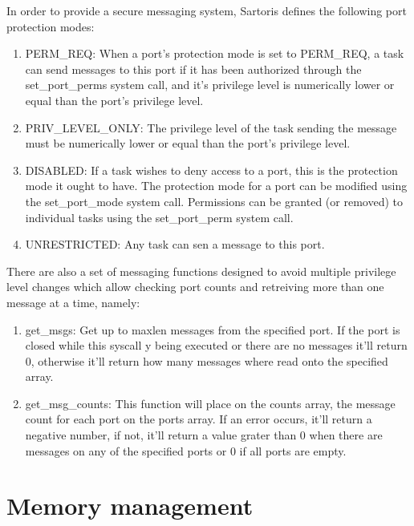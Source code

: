 \documentclass[11pt, letterpaper, twoside, english]{book}
\begin{document}
In order to provide a secure messaging system, Sartoris defines the following port protection modes:
\begin{enumerate}
\item[]\textsf{PERM\_REQ}: When a port's protection mode is set to \textsf{PERM\_REQ}, a task can send messages to this port if it has been authorized through the \textsf{set\_port\_perms} system call, and it's privilege level is numerically lower or equal than the port's privilege level.
\item[]\textsf{PRIV\_LEVEL\_ONLY}: The privilege level of the task sending the message must be numerically lower or equal than the port's privilege level.
\item[]\textsf{DISABLED}: If a task wishes to deny access to a port, this is the protection mode it ought to have.
The protection mode for a port can be modified using the \textsf{set\_port\_mode} system call. Permissions can be granted (or removed) to individual tasks using the \textsf{set\_port\_perm} system call.
\item[]\textsf{UNRESTRICTED}: Any task can sen a message to this port.
\end{enumerate} 

There are also a set of messaging functions designed to avoid multiple privilege level changes which allow checking port counts and retreiving more than one message at a time, namely:

\begin{enumerate}
\item[]\textsf{get\_msgs}: Get up to \textsf{maxlen} messages from the specified port. If the port is closed while this syscall y being executed or there are no messages it'll return \textsf{0}, otherwise it'll return how many messages where read onto the specified array.
\item[]\textsf{get\_msg\_counts}: This function will place on the \textsf{counts} array, the message count for each port on the \textsf{ports} array. If an error occurs, it'll return a negative number, if not, it'll return a value grater than \textsf{0} when there are messages on any of the specified ports or \textsf{0} if all ports are empty.
\end{enumerate}

\section{Memory management} \label{sec:memorymanagement}
\end{document}
